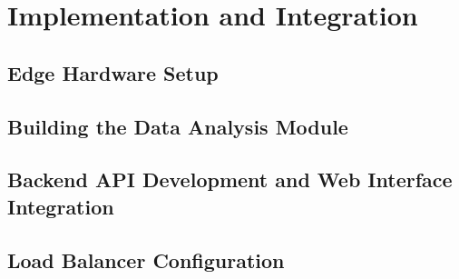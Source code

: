 \clearpage
\section{Implementation and Integration}
\subsection{Edge Hardware Setup}
\subsection{Building the Data Analysis Module}
\subsection{Backend API Development and Web Interface Integration}
\subsection{Load Balancer Configuration}

